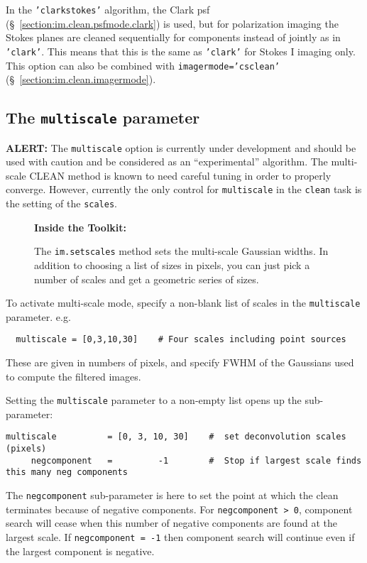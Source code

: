 In the {\tt 'clarkstokes'} algorithm, the Clark psf 
(\S~\ref{section:im.clean.psfmode.clark}) is used, but for 
polarization imaging the Stokes planes are cleaned sequentially for
components instead of jointly as in {\tt 'clark'}.  This means
that this is the same as {\tt 'clark'} for Stokes I imaging only.
This option can also be combined with {\tt imagermode='csclean'}
(\S~\ref{section:im.clean.imagermode}).

\subsection{The {\tt multiscale} parameter}
\label{section:im.clean.multiscale}

{\bf ALERT:} The {\tt multiscale} option is currently under
development and should be used with caution and be considered
as an ``experimental'' algorithm.  The multi-scale CLEAN
method is known to need careful tuning in order to properly converge.
However, currently the only control for
{\tt multiscale} in the {\tt clean} task is the
setting of the {\tt scales}.

\begin{wrapfigure}{r}{2.5in}
  \begin{boxedminipage}{2.5in}
     \centerline{\bf Inside the Toolkit:}
     The {\tt im.setscales} method sets the multi-scale Gaussian
     widths.  In addition to choosing a list of sizes in pixels,
     you can just pick a number of scales and get a geometric series 
     of sizes.
  \end{boxedminipage}
\end{wrapfigure}

To activate multi-scale mode, specify a non-blank list of scales in the 
{\tt multiscale} parameter.  
e.g.
\small
\begin{verbatim}
  multiscale = [0,3,10,30]    # Four scales including point sources
\end{verbatim}
\normalsize
These are given in numbers of pixels, and specify FWHM of the
Gaussians used to compute the filtered images.

Setting the {\tt multiscale} parameter to a non-empty list opens up the sub-parameter:
\small
\begin{verbatim}
multiscale          = [0, 3, 10, 30]    #  set deconvolution scales (pixels)
     negcomponent   =         -1        #  Stop if largest scale finds this many neg components
\end{verbatim}
\normalsize
The {\tt negcomponent} sub-parameter is here to set
the point at which the clean terminates because of negative
components.  For {\tt negcomponent > 0}, component search will cease
when this number of negative components are found at the largest
scale.  If {\tt negcomponent = -1} then component search will continue
even if the largest component is negative.

